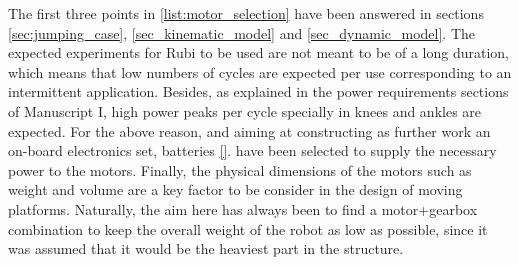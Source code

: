 The first three points in \ref{list:motor_selection} have been answered in sections \ref{sec:jumping_case}, \ref{sec_kinematic_model} and \ref{sec_dynamic_model}.
The expected experiments for Rubi to be used are not meant to be of a long duration, which means that low numbers of cycles are expected per use corresponding to an intermittent application.
Besides, as explained in the power requirements sections of \cite{grimmer} Manuscript I, high power peaks per cycle specially in knees and ankles are expected.
For the above reason, and aiming at constructing as further work an on-board electronics set, batteries \ref{}. 
have been selected to supply the necessary power to the motors.
Finally, the physical dimensions of the motors such as weight and volume are a key factor to be consider in the design of moving platforms. 
Naturally, the aim here has always been to find a motor+gearbox combination to keep the overall weight of the robot as low as possible, since it was assumed that it would be the heaviest part in the structure.
